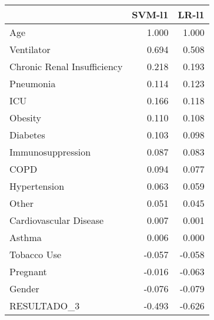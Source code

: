 \begin{tabular}{lrr}
\toprule
{} &  SVM-l1 &  LR-l1 \\
\midrule
Age                         &   1.000 &  1.000 \\
Ventilator                  &   0.694 &  0.508 \\
Chronic Renal Insufficiency &   0.218 &  0.193 \\
Pneumonia                   &   0.114 &  0.123 \\
ICU                         &   0.166 &  0.118 \\
Obesity                     &   0.110 &  0.108 \\
Diabetes                    &   0.103 &  0.098 \\
Immunosuppression           &   0.087 &  0.083 \\
COPD                        &   0.094 &  0.077 \\
Hypertension                &   0.063 &  0.059 \\
Other                       &   0.051 &  0.045 \\
Cardiovascular Disease      &   0.007 &  0.001 \\
Asthma                      &   0.006 &  0.000 \\
Tobacco Use                 &  -0.057 & -0.058 \\
Pregnant                    &  -0.016 & -0.063 \\
Gender                      &  -0.076 & -0.079 \\
RESULTADO\_3                 &  -0.493 & -0.626 \\
\bottomrule
\end{tabular}
